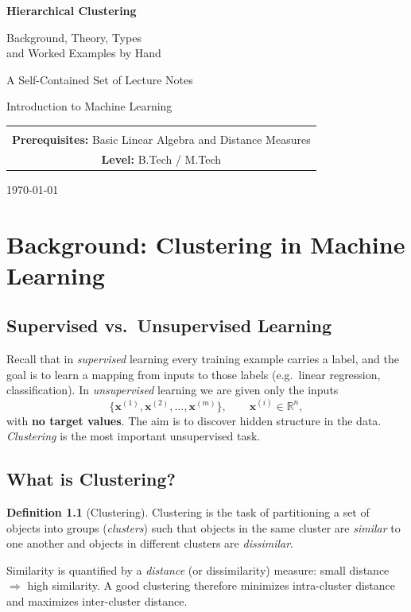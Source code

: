\documentclass[11pt,a4paper]{report}
\theoremstyle{definition}
\newtheorem{definition}{Definition}[chapter]
\theoremstyle{plain}
\theoremstyle{remark}
\newcommand{\R}{\mathbb{R}}
\newcommand{\vx}{\mathbf{x}}
\begin{document}
\begin{titlepage}
\centering
\vspace*{2cm}
{\Huge\bfseries Hierarchical Clustering\par}
\vspace{0.6cm}
{\Large Background, Theory, Types\\[2pt]
and Worked Examples by Hand\par}
\vspace{1.5cm}
{\large A Self-Contained Set of Lecture Notes\par}
\vspace{0.4cm}
{\large Introduction to Machine Learning\par}
\vspace{2.5cm}
\begin{tabular}{c}
\hline\\[-6pt]
\textbf{Prerequisites:} Basic Linear Algebra and Distance Measures\\[4pt]
\textbf{Level:} B.Tech / M.Tech\\[4pt]
\hline
\end{tabular}
\vfill
{\large \today\par}
\end{titlepage}

\tableofcontents
\clearpage

\chapter{Background: Clustering in Machine Learning}

\section{Supervised vs.\ Unsupervised Learning}
Recall that in \emph{supervised} learning every training example carries a
label, and the goal is to learn a mapping from inputs to those labels
(e.g.\ linear regression, classification). In \emph{unsupervised} learning we
are given only the inputs
\[
\{\vx^{(1)},\vx^{(2)},\dots,\vx^{(m)}\},\qquad \vx^{(i)}\in\R^{n},
\]
with \textbf{no target values}. The aim is to discover hidden structure in the
data. \emph{Clustering} is the most important unsupervised task.

\section{What is Clustering?}
\begin{definition}[Clustering]
Clustering is the task of partitioning a set of objects into groups
(\emph{clusters}) such that objects in the same cluster are \emph{similar} to
one another and objects in different clusters are \emph{dissimilar}.
\end{definition}
Similarity is quantified by a \emph{distance} (or dissimilarity) measure: small
distance $\Rightarrow$ high similarity. A good clustering therefore minimizes
intra-cluster distance and maximizes inter-cluster distance.
\end{document}
